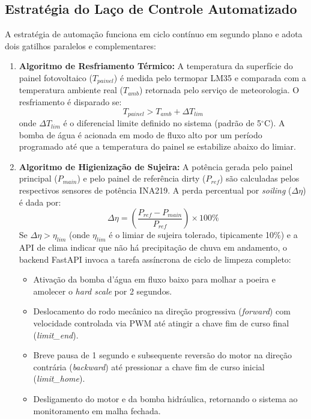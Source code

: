 \documentclass[12pt, a4paper]{article}
\begin{document}
\subsection{Estratégia do Laço de Controle Automatizado}

A estratégia de automação funciona em ciclo contínuo em segundo plano e adota dois gatilhos paralelos e complementares:
\begin{enumerate}
    \item \textbf{Algoritmo de Resfriamento Térmico:} A temperatura da superfície do painel fotovoltaico ($T_{painel}$) é medida pelo termopar LM35 e comparada com a temperatura ambiente real ($T_{amb}$) retornada pelo serviço de meteorologia. O resfriamento é disparado se:
    \begin{equation}
        T_{painel} > T_{amb} + \Delta T_{lim}
    \end{equation}
    onde $\Delta T_{lim}$ é o diferencial limite definido no sistema (padrão de 5$^\circ$C). A bomba de água é acionada em modo de fluxo alto por um período programado até que a temperatura do painel se estabilize abaixo do limiar.
    \item \textbf{Algoritmo de Higienização de Sujeira:} A potência gerada pelo painel principal ($P_{main}$) e pelo painel de referência dirty ($P_{ref}$) são calculadas pelos respectivos sensores de potência INA219. A perda percentual por \textit{soiling} ($\Delta \eta$) é dada por:
    \begin{equation}
        \Delta \eta = \left( \frac{P_{ref} - P_{main}}{P_{ref}} \right) \times 100\%
    \end{equation}
    Se $\Delta \eta > \eta_{lim}$ (onde $\eta_{lim}$ é o limiar de sujeira tolerado, tipicamente 10\%) e a API de clima indicar que não há precipitação de chuva em andamento, o backend FastAPI invoca a tarefa assíncrona de ciclo de limpeza completo:
    \begin{itemize}
        \item Ativação da bomba d'água em fluxo baixo para molhar a poeira e amolecer o \textit{hard scale} por 2 segundos.
        \item Deslocamento do rodo mecânico na direção progressiva (\textit{forward}) com velocidade controlada via PWM até atingir a chave fim de curso final (\textit{limit\_end}).
        \item Breve pausa de 1 segundo e subsequente reversão do motor na direção contrária (\textit{backward}) até pressionar a chave fim de curso inicial (\textit{limit\_home}).
        \item Desligamento do motor e da bomba hidráulica, retornando o sistema ao monitoramento em malha fechada.
    \end{itemize}
\end{enumerate}
\end{document}
